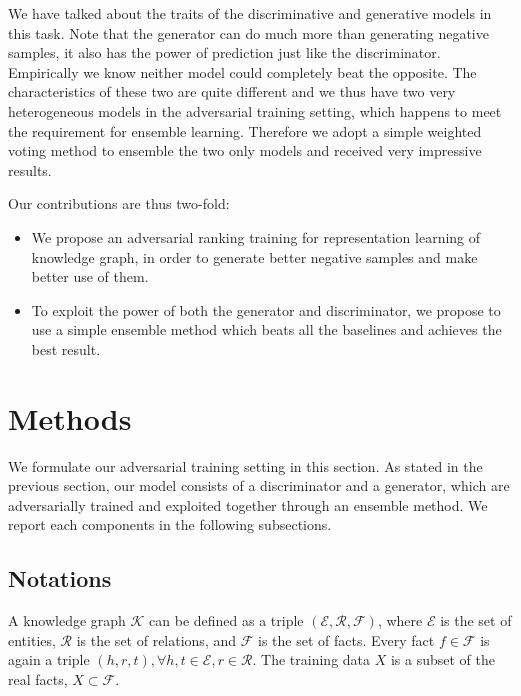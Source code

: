 \documentclass[twocolumn,a4paper,10pt,preprint,3p]{elsarticle}
\begin{document}
We have talked about the traits of the discriminative and generative models in this task. Note that the generator can do much more than generating negative samples, it also has the power of prediction just like the discriminator. Empirically we know neither model could completely beat the opposite. The characteristics of these two are quite different and we thus have two very heterogeneous models in the adversarial training setting, which happens to meet the requirement for ensemble learning. Therefore we adopt a simple weighted voting method to ensemble the two only models and received very impressive results.

Our contributions are thus two-fold:
\begin{itemize}
    \item We propose an adversarial ranking training for representation learning of knowledge graph, in order to generate better negative samples and make better use of them.
    \item To exploit the power of both the generator and discriminator, we propose to use a simple ensemble method which beats all the baselines and achieves the best result.
\end{itemize}




\section{Methods}

We formulate our adversarial training setting in this section. As stated in the previous section, our model consists of a discriminator and a generator, which are adversarially trained and exploited together through an ensemble method. We report each components in the following subsections.

\subsection{Notations}

A knowledge graph $\mathcal{K}$ can be defined as a triple $(\mathcal{E}, \mathcal{R}, \mathcal{F})$, where $\mathcal{E}$ is the set of entities, $\mathcal{R}$ is the set of relations, and $\mathcal{F}$ is the set of facts. Every fact $f\in \mathcal{F}$ is again a triple $(h, r, t), \forall h,t\in\mathcal{E}, r\in\mathcal{R}$. The training data $X$ is a subset of the real facts, $X \subset \mathcal{F}$.
\end{document}

